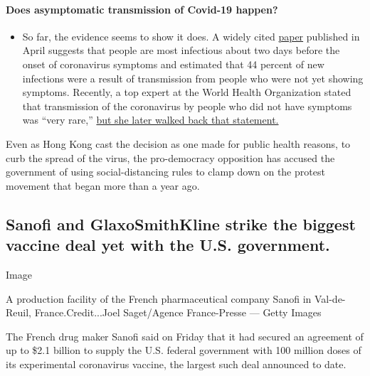 \begin{itemize}
{  \paragraph{Does asymptomatic transmission of Covid-19
  happen?}\label{does-asymptomatic-transmission-of-covid-19-happen}}

  \begin{itemize}
  \tightlist
  \item
    So far, the evidence seems to show it does. A widely cited
    \href{https://www.nature.com/articles/s41591-020-0869-5}{paper}
    published in April suggests that people are most infectious about
    two days before the onset of coronavirus symptoms and estimated that
    44 percent of new infections were a result of transmission from
    people who were not yet showing symptoms. Recently, a top expert at
    the World Health Organization stated that transmission of the
    coronavirus by people who did not have symptoms was ``very rare,''
    \href{https://www.nytimes.com/2020/06/09/world/coronavirus-updates.html?action=click\&pgtype=Article\&state=default\&region=MAIN_CONTENT_3\&context=storylines_faq\#link-1f302e21}{but
    she later walked back that statement.}
  \end{itemize}
\end{itemize}

Even as Hong Kong cast the decision as one made for public health
reasons, to curb the spread of the virus, the pro-democracy opposition
has accused the government of using social-distancing rules to clamp
down on the protest movement that began more than a year ago.

\hypertarget{sanofi-and-glaxosmithkline-strike-the-biggest-vaccine-deal-yet-with-the-us-government}{%
\subsection{Sanofi and GlaxoSmithKline strike the biggest vaccine deal
yet with the U.S.
government.}\label{sanofi-and-glaxosmithkline-strike-the-biggest-vaccine-deal-yet-with-the-us-government}}

Image

A production facility of the French pharmaceutical company Sanofi in
Val-de-Reuil, France.Credit...Joel Saget/Agence France-Presse --- Getty
Images

The French drug maker Sanofi said on Friday that it had secured an
agreement of up to \$2.1 billion to supply the U.S. federal government
with 100 million doses of its experimental coronavirus vaccine, the
largest such deal announced to date.

